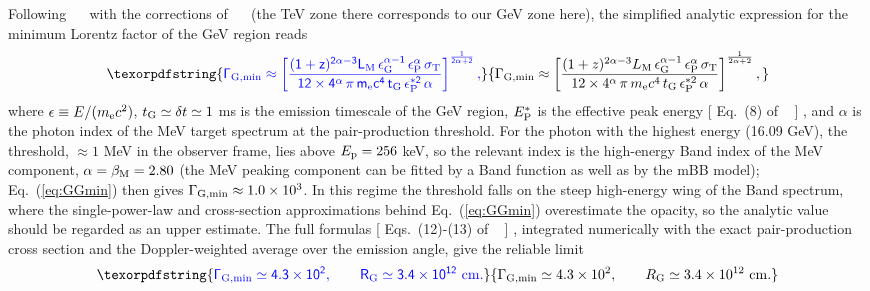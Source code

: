 \documentclass[prd,twocolumn,amsmath,amssymb,aps,linenumbers]{revtex4-2} %
\providecommand{\DIFaddtex}[1]{{\protect\color{blue} \sf #1}} %
\providecommand{\DIFaddend}{} %
\providecommand{\DIFdelbegin}{} %
\providecommand{\DIFdelend}{} %
\providecommand{\DIFadd}[1]{\texorpdfstring{\DIFaddtex{#1}}{#1}} %
\newcommand{\DIFscaledelfig}{0.5}
\newlength{\DIFdelgraphicswidth} %
\newlength{\DIFdelgraphicsheight} %
\newcommand{\DIFdelincludegraphics}[2][]{%
\sbox{\DIFdelgraphicsbox}{\DIFOincludegraphics[#1]{#2}}%
\settoboxwidth{\DIFdelgraphicswidth}{\DIFdelgraphicsbox} %
\settoboxtotalheight{\DIFdelgraphicsheight}{\DIFdelgraphicsbox} %
\scalebox{\DIFscaledelfig}{%
\parbox[b]{\DIFdelgraphicswidth}{\usebox{\DIFdelgraphicsbox}\\[-\baselineskip] \rule{\DIFdelgraphicswidth}{0em}}\llap{\resizebox{\DIFdelgraphicswidth}{\DIFdelgraphicsheight}{%
\setlength{\unitlength}{\DIFdelgraphicswidth}%
\begin{picture}(1,1)%
\thicklines\linethickness{2pt} %
{\color[rgb]{1,0,0}\put(0,0){\framebox(1,1){}}}%
{\color[rgb]{1,0,0}\put(0,0){\line( 1,1){1}}}%
{\color[rgb]{1,0,0}\put(0,1){\line(1,-1){1}}}%
\end{picture}%
}\hspace*{3pt}}} %
} %
\DeclareRobustCommand{\DIFaddend}{\DIFOaddend \let\includegraphics\DIFOincludegraphics} %
\DeclareRobustCommand{\DIFdelbegin}{\DIFOdelbegin \let\includegraphics\DIFdelincludegraphics} %
\DeclareRobustCommand{\DIFdelend}{\DIFOaddend \let\includegraphics\DIFOincludegraphics} %
\begin{document}
\DIFadd{Following \mbox{%
\cite{2011ApJ...726L...2Z} }\hskip0pt%
with the corrections of \mbox{%
\cite{2023ApJ...956L..38G} }\hskip0pt%
(the TeV zone there corresponds to our GeV zone here), the simplified analytic expression for the minimum Lorentz factor of the GeV region reads
}\begin{equation}\DIFadd{\label{eq:GGmin}
\Gamma_{\rm G,min}\approx\left[\frac{(1+z)^{2\alpha-3}L_{\rm M}\,\epsilon_{\rm G}^{\alpha-1}\,\epsilon_{\rm P}^{\alpha}\,\sigma_{\rm T}}{12\times4^{\alpha}\,\pi\,m_{\rm e}c^{4}\,t_{\rm G}\,\epsilon_{\rm P}^{*2}\,\alpha}\right]^{\frac{1}{2\alpha+2}},
}\end{equation}
\DIFadd{where $\epsilon\equiv E/(m_{\rm e}c^{2})$, $t_{\rm G}\simeq\delta t\simeq1$ ms is the emission timescale of the GeV region, $E_{\rm P}^{*}$ is the effective peak energy }[\DIFadd{Eq.~(8) of \mbox{%
\citealt{2023ApJ...956L..38G}}\hskip0pt%
}]\DIFadd{, and $\alpha$ is the photon index of the MeV target spectrum at the pair-production threshold. For the photon with the highest energy (16.09 GeV), the threshold, $\approx1$ MeV in the observer frame, lies above $E_{\rm p}=256$ keV, so the relevant index is the high-energy Band index of the MeV component, $\alpha=\beta_{\rm M}=2.80$ (the MeV peaking component can be fitted by a Band function as well as by the mBB model); Eq.~(\ref{eq:GGmin}) then gives $\Gamma_{\rm G,min}\approx1.0\times10^{3}$. In this regime the threshold falls on the steep high-energy wing of the Band spectrum, where the single-power-law and cross-section approximations behind Eq.~(\ref{eq:GGmin}) overestimate the opacity, so the analytic value should be regarded as an upper estimate. The full formulas }[\DIFadd{Eqs.~(12)-(13) of \mbox{%
\citealt{2023ApJ...956L..38G}}\hskip0pt%
}]\DIFadd{, integrated numerically with the exact pair-production cross section and the Doppler-weighted average over the emission angle, give the reliable limit
}\begin{equation}
\DIFadd{\Gamma_{\rm G,min}\simeq4.3\times10^{2},\qquad R_{\rm G}\simeq3.4\times10^{12}\ {\rm cm}.
}\end{equation}\DIFaddend 
\DIFdelbegin %
\DIFdelend 
\end{document}
